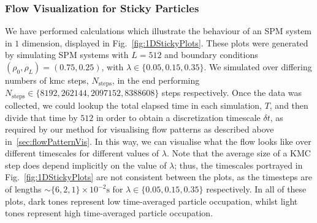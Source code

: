 \subsubsection{Flow Visualization for Sticky Particles} \label{sec:1DStickyPlots}
We have performed calculations which illustrate the behaviour of an SPM system in $1$ dimension, displayed
in Fig.~\ref{fig:1DStickyPlots}. These plots were generated by simulating SPM systems with $L=512$
and boundary conditions $(\rho_0 , \rho_L) = (0.75, 0.25)$, with $\lambda \in \{ 0.05, 0.15, 0.35 \}$.
We simulated over differing numbers of kmc steps, $N_\mathrm{steps}$, in the end performing
$N_\mathrm{steps} \in \{ 8192, 262144, 2097152, 8388608 \}$ steps respectively. Once the data was collected,
we could lookup the total elapsed time in each simulation, $T$, and then divide that time by $512$ in order
to obtain a discretization timescale $\delta t$, as required by our method for visualising flow patterns
as described above in~\ref{sec:flowPatternVis}. In this way, we can visualise what the flow looks like over
different timescales for different values of $\lambda$. Note that the average size of a KMC step does depend
implicitly on the value of $\lambda$; thus, the timescales portrayed in Fig.~\ref{fig:1DStickyPlots}
are not consistent between the plots, as the timesteps are of lengths 
$\sim \{ 6, 2, 1 \}\times 10^{-2} \mathrm{s}$ for $\lambda \in \{ 0.05, 0.15, 0.35 \} $ respectively. In
all of these plots, dark tones represent low time-averaged particle occupation, whilst light tones
represent high time-averaged particle occupation.
